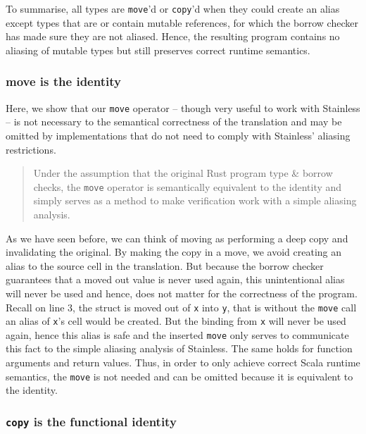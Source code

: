 To summarise, all types are \passthrough{\lstinline!move!}'d or
\passthrough{\lstinline!copy!}'d when they could create an alias except
types that are or contain mutable references, for which the borrow
checker has made sure they are not aliased. Hence, the resulting program
contains no aliasing of mutable types but still preserves correct
runtime semantics.

\subsubsection{move is the identity}

Here, we show that our \passthrough{\lstinline!move!} operator --
though very useful to work with Stainless -- is not necessary to the
semantical correctness of the translation and may be omitted by implementations
that do not need to comply with Stainless' aliasing restrictions.

\begin{quote}
Under the assumption that the original Rust program type \& borrow
checks, the \passthrough{\lstinline!move!} operator is semantically
equivalent to the identity and simply serves as a method to make
verification work with a simple aliasing analysis.
\end{quote}

As we have seen before, we can think of moving as performing a deep copy and
invalidating the original. By making the copy in a move, we avoid creating an
alias to the source cell in the translation. But because the borrow checker
guarantees that a moved out value is never used again, this unintentional alias
will never be used and hence, does not matter for the correctness of the
program. Recall  on line 3, the struct is moved out of
\passthrough{\lstinline!x!} into \passthrough{\lstinline!y!}, that is without
the \passthrough{\lstinline!move!} call an alias of
\passthrough{\lstinline!x!}'s cell would be created. But the binding from
\passthrough{\lstinline!x!} will never be used again, hence this alias is safe
and the inserted \passthrough{\lstinline!move!} only serves to communicate this
fact to the simple aliasing analysis of Stainless. The same holds for function
arguments and return values. Thus, in order to only achieve correct Scala
runtime semantics, the \passthrough{\lstinline!move!} is not needed and can be
omitted because it is equivalent to the identity.

\subsubsection{\texorpdfstring{\texttt{copy} is the functional
identity}{copy is the functional identity}}


